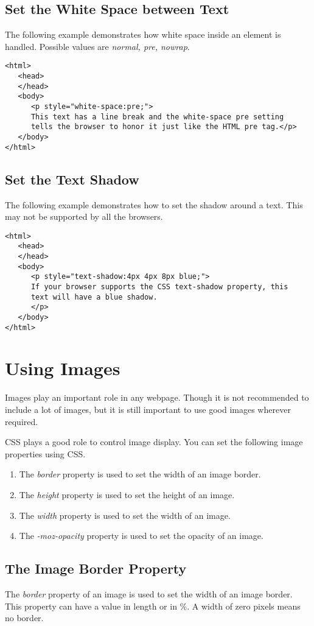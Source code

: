 \documentclass[a4paper,oneside]{book}
\numberwithin{equation}{chapter}
\begin{document}
\subsection{Set the White Space between Text}
The following example demonstrates how white space inside an element is handled. Possible values are \textit{normal, pre, nowrap}.
\begin{verbatim}
<html>
   <head>
   </head>
   <body>
      <p style="white-space:pre;">
      This text has a line break and the white-space pre setting
      tells the browser to honor it just like the HTML pre tag.</p> 
   </body>
</html> 
\end{verbatim}
\subsection{Set the Text Shadow}
The following example demonstrates how to set the shadow around a text. This may not be supported by all the browsers.
\begin{verbatim}
<html>
   <head>
   </head>
   <body>
      <p style="text-shadow:4px 4px 8px blue;">
      If your browser supports the CSS text-shadow property, this 
      text will have a blue shadow.
      </p>
   </body>
</html> 
\end{verbatim}
\section{Using Images}
Images play an important role in any webpage. Though it is not recommended to include a lot of images, but it is still important to use good images wherever required.

CSS plays a good role to control image display. You can set the following image properties using CSS.
\begin{enumerate}
\item The \textit{border} property is used to set the width of an image border.
\item The \textit{height} property is used to set the height of an image.
\item The \textit{width} property is used to set the width of an image.
\item The \textit{-moz-opacity} property is used to set the opacity of an image.
\end{enumerate}
\subsection{The Image Border Property}
The \textit{border} property of an image is used to set the width of an image border. This property can have a value in length or in \%. A width of zero pixels means no border.
\end{document}
